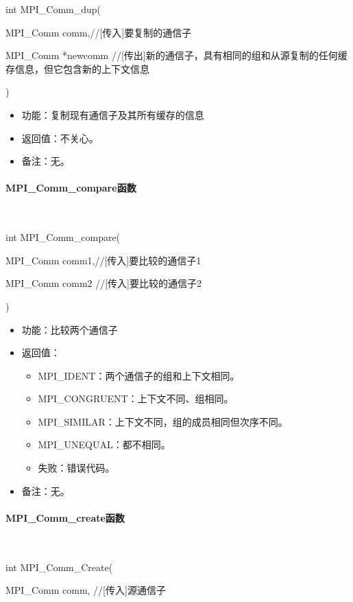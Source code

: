 \documentclass[UTF8]{article}%
\begin{document}
int MPI\_Comm\_dup(
    
    \qquad MPI\_Comm comm,//[传入]要复制的通信子

    \qquad MPI\_Comm *newcomm //[传出]新的通信子，具有相同的组和从源复制的任何缓存信息，但它包含新的上下文信息
    
    )

\begin{itemize}
    \item 功能：复制现有通信子及其所有缓存的信息
    \item 返回值：不关心。
    \item 备注：无。
\end{itemize}

\paragraph{MPI\_Comm\_compare函数}~{}

int MPI\_Comm\_compare(
    
    \qquad MPI\_Comm comm1,//[传入]要比较的通信子1

    \qquad MPI\_Comm comm2 //[传入]要比较的通信子2
    
    )

\begin{itemize}
    \item 功能：比较两个通信子
    \item 返回值：
    
    {
        \begin{itemize}
            \item MPI\_IDENT：两个通信子的组和上下文相同。
            \item MPI\_CONGRUENT：上下文不同、组相同。
            \item MPI\_SIMILAR：上下文不同，组的成员相同但次序不同。
            \item MPI\_UNEQUAL：都不相同。
            \item 失败：错误代码。    
        \end{itemize}
    }
    \item 备注：无。
\end{itemize}


\paragraph{MPI\_Comm\_create函数}~{}

int MPI\_Comm\_Create(
    
    \qquad MPI\_Comm comm, //[传入]源通信子
\end{document}

